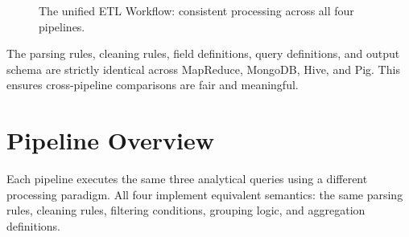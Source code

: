 \documentclass[11pt,a4paper]{article}
\begin{document}
\begin{figure}[H]
{
}
\caption{The unified ETL Workflow: consistent processing across all four pipelines.}
\label{fig:refined_etl}
\end{figure}

\begin{notebox}
The parsing rules, cleaning rules, field definitions, query definitions, and output schema are strictly identical across MapReduce, MongoDB, Hive, and Pig. This ensures cross-pipeline comparisons are fair and meaningful.
\end{notebox}
\section{Pipeline Overview}

Each pipeline executes the same three analytical queries using a different processing paradigm. All four implement equivalent semantics: the same parsing rules, cleaning rules, filtering conditions, grouping logic, and aggregation definitions.
\end{document}
